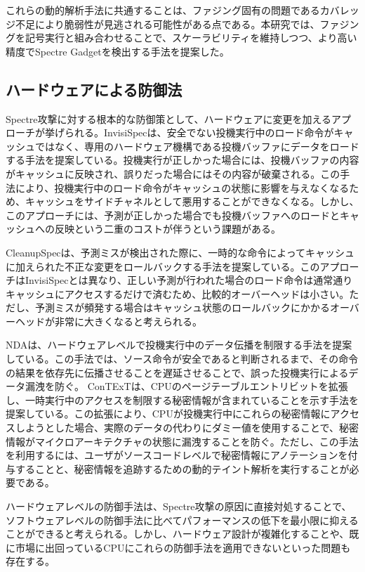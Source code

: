 これらの動的解析手法に共通することは、ファジング固有の問題であるカバレッジ不足により脆弱性が見逃される可能性がある点である。本研究では、ファジングを記号実行と組み合わせることで、スケーラビリティを維持しつつ、より高い精度でSpectre Gadgetを検出する手法を提案した。\par

\subsection{ハードウェアによる防御法}
Spectre攻撃に対する根本的な防御策として、ハードウェアに変更を加えるアプローチが挙げられる。InvisiSpec\cite{yan2018invisispec}は、安全でない投機実行中のロード命令がキャッシュではなく、専用のハードウェア機構である投機バッファにデータをロードする手法を提案している。投機実行が正しかった場合には、投機バッファの内容がキャッシュに反映され、誤りだった場合にはその内容が破棄される。この手法により、投機実行中のロード命令がキャッシュの状態に影響を与えなくなるため、キャッシュをサイドチャネルとして悪用することができなくなる。しかし、このアプローチには、予測が正しかった場合でも投機バッファへのロードとキャッシュへの反映という二重のコストが伴うという課題がある。

CleanupSpec\cite{saileshwar2019cleanupspec}は、予測ミスが検出された際に、一時的な命令によってキャッシュに加えられた不正な変更をロールバックする手法を提案している。このアプローチはInvisiSpecとは異なり、正しい予測が行われた場合のロード命令は通常通りキャッシュにアクセスするだけで済むため、比較的オーバーヘッドは小さい。ただし、予測ミスが頻発する場合はキャッシュ状態のロールバックにかかるオーバーヘッドが非常に大きくなると考えられる。

NDA\cite{weisse2019nda}は、ハードウェアレベルで投機実行中のデータ伝播を制限する手法を提案している。この手法では、ソース命令が安全であると判断されるまで、その命令の結果を依存先に伝播させることを遅延させることで、誤った投機実行によるデータ漏洩を防ぐ。
ConTExT\cite{schwarz2020context}は、CPUのページテーブルエントリビットを拡張し、一時実行中のアクセスを制限する秘密情報が含まれていることを示す手法を提案している。この拡張により、CPUが投機実行中にこれらの秘密情報にアクセスしようとした場合、実際のデータの代わりにダミー値を使用することで、秘密情報がマイクロアーキテクチャの状態に漏洩することを防ぐ。ただし、この手法を利用するには、ユーザがソースコードレベルで秘密情報にアノテーションを付与することと、秘密情報を追跡するための動的テイント解析を実行することが必要である。\par

ハードウェアレベルの防御手法は、Spectre攻撃の原因に直接対処することで、ソフトウェアレベルの防御手法に比べてパフォーマンスの低下を最小限に抑えることができると考えられる。しかし、ハードウェア設計が複雑化することや、既に市場に出回っているCPUにこれらの防御手法を適用できないといった問題も存在する。\par

